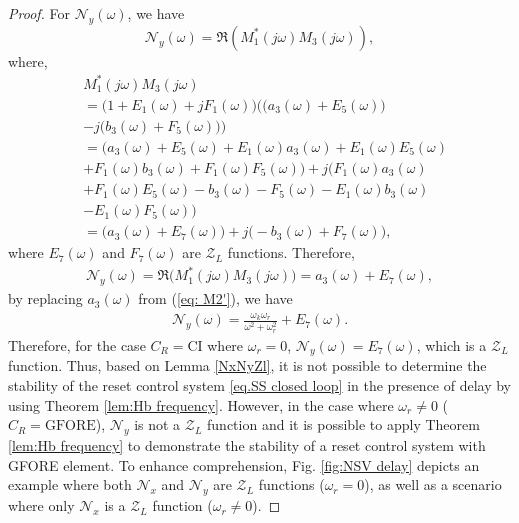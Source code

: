 \begin{proof}
For $\mathcal{N}_y (\omega)$, we have
\begin{equation}
    \mathcal{N}_y (\omega)=\mathfrak{R}(M_1^{*}(j\omega)M_3(j\omega)),
\end{equation}
where, 
\begin{equation}
\begin{split}
    &M_1^{*}(j\omega)M_3(j\omega)\\
    &=\bigg(1+E_1(\omega)+jF_1(\omega)\bigg)\bigg(\Big(a_3(\omega)+E_5(\omega)\Big)\\
    &-j\Big(b_3(\omega)+F_5(\omega)\Big)\bigg)\\
    &=\Big(a_3(\omega)+E_5(\omega)+E_1(\omega)a_3(\omega)+E_1(\omega)E_5(\omega)\\
   &+F_1(\omega)b_3(\omega)+F_1(\omega)F_5(\omega)\Big)+j\Big(F_1(\omega)a_3(\omega)\\
   &+F_1(\omega)E_5(\omega)-b_3(\omega)-F_5(\omega)-E_1(\omega)b_3(\omega)\\
   &-E_1(\omega)F_5(\omega)\Big)\\
   &=\Big(a_3(\omega)+E_7(\omega)\Big)+j\Big(-b_3(\omega)+F_7(\omega)\Big),
    \end{split}
\end{equation}
where $E_7(\omega)$ and $F_7(\omega)$ are $\mathcal{Z}_L$ functions. Therefore,
\begin{equation}
\begin{split}
    \mathcal{N}_y (\omega)=\mathfrak{R}\Big(M_1^{*}(j\omega)M_3(j\omega)\Big)=a_3(\omega)+E_7(\omega),
    \end{split}
\end{equation}
by replacing $a_3(\omega)$ from (\ref{eq: M2'}), we have
\begin{equation}
\begin{split}
    \mathcal{N}_y (\omega)=\frac{\omega_k \omega_r}{\omega^2+\omega_r ^{2}}+E_7(\omega).
    \end{split}
\end{equation}
Therefore, for the case $C_R=\text{CI}$ where $\omega_r= 0$, $\mathcal{N}_y (\omega)=E_7(\omega)$, which is a $\mathcal{Z}_L$ function. Thus, based on Lemma \ref{NxNyZl}, it is not possible to determine the stability of the reset control system \eqref{eq.SS closed loop} in the presence of delay by using Theorem \ref{lem:Hb frequency}.
However, in the case where $\omega_r\neq 0$ ($C_R=\text{GFORE}$), $\mathcal{N}_y$ is not a $\mathcal{Z}_L$ function and it is possible to apply Theorem \ref{lem:Hb frequency} to demonstrate the stability of a reset control system with GFORE element. To enhance comprehension, Fig. \ref{fig:NSV delay} depicts an example where both $\mathcal{N}_x$ and $\mathcal{N}_y$ are $\mathcal{Z}_L$ functions ($\omega_r= 0$), as well as a scenario where only $\mathcal{N}_x$ is a $\mathcal{Z}_L$ function ($\omega_r\neq 0$).
\end{proof}

